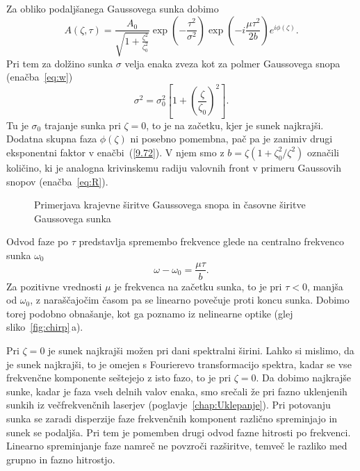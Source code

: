 Za obliko podaljšanega Gaussovega sunka dobimo
\begin{equation}
A\left(\zeta,\tau\right)=\frac{A_{0}}{\sqrt{1+\frac{\zeta^{2}
}{\zeta_{0}^{2}}}}\exp\left(-\frac{\tau^{2}}{\sigma^{2}}\right)\exp
\left(-i\frac{\mu\tau^{2}}{2b}\right)e^{i\phi\left(\zeta\right)}.
\label{9.72}
\end{equation}
Pri tem za dolžino sunka $\sigma$ velja enaka zveza kot za polmer 
Gaussovega snopa (enačba~\ref{eq:w})
\begin{equation}
\sigma^{2}=\sigma_{0}^{2}\left[1+\left(\frac{\zeta}{\zeta_{0}}\right)^{2}\right].
\label{9.73}
\end{equation}
Tu je $\sigma_{0}$ trajanje sunka pri $\zeta=0$, to je na začetku,
kjer je sunek najkrajši. Dodatna skupna faza $\phi\left(\zeta\right)$
ni posebno pomembna, pač pa je zanimiv drugi eksponentni faktor v
enačbi~(\ref{9.72}). V njem smo z $b=\zeta\left(1+\zeta_{0}^{2}/\zeta^{2}\right)$
označili količino, ki je analogna krivinskemu radiju valovnih front
v primeru Gaussovih snopov (enačba~\ref{eq:R}).
\begin{figure}[h]
\centering
\def\svgwidth{110truemm} 

\caption{Primerjava krajevne širitve Gaussovega snopa in časovne širitve Gaussovega sunka}
\label{fig:Gausstau}
\end{figure}

Odvod faze po $\tau$ predstavlja spremembo
frekvence glede na centralno frekvenco sunka $\omega_{0}$
\begin{equation}
\omega-\omega_{0}=\frac{\mu\tau}{b}.
\label{9.74}
\end{equation}
Za pozitivne vrednosti $\mu$ je frekvenca na začetku sunka,
to je pri $\tau<0$, manjša od $\omega_0$, z naraščajočim časom pa se 
linearno povečuje proti koncu sunka.
Dobimo torej podobno obnašanje, kot ga poznamo iz nelinearne optike
(glej sliko~\ref{fig:chirp}\,a). 

\begin{remark}
Pri $\zeta=0$ je sunek najkrajši možen pri dani spektralni
širini. Lahko si mislimo, da je sunek najkrajši,
to je omejen s Fourierevo transformacijo spektra, kadar se
vse frekvenčne komponente seštejejo z isto fazo, to je pri $\zeta=0$.
Da dobimo najkrajše sunke, kadar je faza vseh delnih valov enaka,
smo srečali že pri fazno uklenjenih sunkih iz večfrekvenčnih laserjev
(poglavje~\ref{chap:Uklepanje}).
Pri potovanju sunka se zaradi disperzije faze frekvenčnih komponent
različno spreminjajo in sunek se podaljša. Pri tem je pomemben  
drugi odvod fazne hitrosti po frekvenci. Linearno spreminjanje faze 
namreč ne povzroči razširitve, temveč le razliko med grupno in fazno hitrostjo.
\end{remark}

